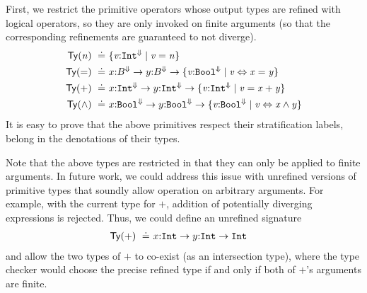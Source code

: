 First, we restrict the primitive operators whose output 
types are refined with logical operators, so they are only 
invoked on finite arguments (so that the corresponding 
refinements are guaranteed to not diverge).
%
\begin{align*}
  \constty{\mathtt{\n}} \defeq & \tlref{\vv}{\tint}{\finite}{\vv = \n} \\
  \constty{\mathtt{=}} \defeq & \tfun{x}
                                     {\tbase^\finite}
                                     {\tfun{y}
                                           {\tbase^\finite}
                                           {\tlref{\vv}{\tbool}{\finite}{\vv \Leftrightarrow \x = \y}}} \\
  \constty{\mathtt{+}} \defeq & \tfun{x}
                                     {\tint^\finite}
                                     {\tfun{y}
                                           {\tint^\finite}
                                           {\tlref{\vv}{\tint}{\finite}{\vv = \x + \y}}}\\
  \constty{\mathtt{\land}} \defeq & \tfun{x}
                                         {\tbool^\finite}
                                         {\tfun{y}
                                               {\tbool^\finite}
                                               {\tlref{\vv}{\tbool}{\finite}{\vv \Leftrightarrow \x \land \y}}}
\end{align*}
%
It is easy to prove that the above primitives respect 
their stratification labels, \ie belong in the denotations
of their types. 

Note that the above types are restricted in that they can only be applied to finite arguments.
%
In future work, we could address this issue with unrefined versions of primitive types
that soundly allow operation on arbitrary arguments.
%
For example, with the current type for $\mathtt{+}$, addition of potentially 
diverging expressions is rejected.
%
Thus, we could define an unrefined signature 
\begin{align*}
  \mathsf{Ty}(\mathtt{+}) \ \doteq\  & {x} \text{:} {\ensuremath{\mathtt{Int}}} \rightarrow {y} \text{:} {\ensuremath{\mathtt{Int}}} \rightarrow \mathtt{Int}
\end{align*}
and allow the two types of $\mathtt{+}$ to co-exist (as an intersection type),
where the type checker would choose the precise refined type 
if and only if both of $\mathtt{+}$'s arguments are finite.

